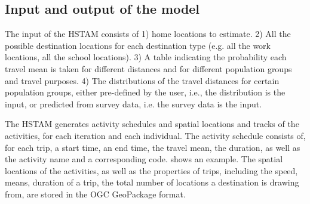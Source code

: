 \documentclass[]{article}
\begin{document}
\subsection{Input and output of the model}

The input of the HSTAM consists of 1) home locations to estimate. 2) All the possible destination locations for each destination type (e.g. all the work locations, all the school locations). 3) A table indicating the probability each travel mean is taken for different distances and for different population groups and travel purposes. 4) The distributions of the travel distances for certain population groups, either pre-defined by the user, i.e., the distribution is the input, or predicted from survey data, i.e. the survey data is the input.
 

The HSTAM generates activity schedules and spatial locations and tracks of the activities, for each iteration and each individual. The activity schedule consists of, for each trip, a start time, an end time, the travel mean, the duration, as well as the activity name and a corresponding code.  shows an example. The spatial locations of the activities, as well as the properties of trips, including the speed, means, duration of a trip, the total number of locations a destination is drawing from, are stored in the OGC GeoPackage format. 

\begin{table}[]
\caption{An example of activity schedules. h2w means "home to work", and w2h means "work to home". The "bicycle" indicates the transportation mean, which is generated from the activity model. The integer part indicates hours, and the digits indicate minutes in percentage, e.g., 9.89 is at around 9:54 am (54 = 89*0.6).}
\label{tab:sche}
\end{table}
 
\end{document}
